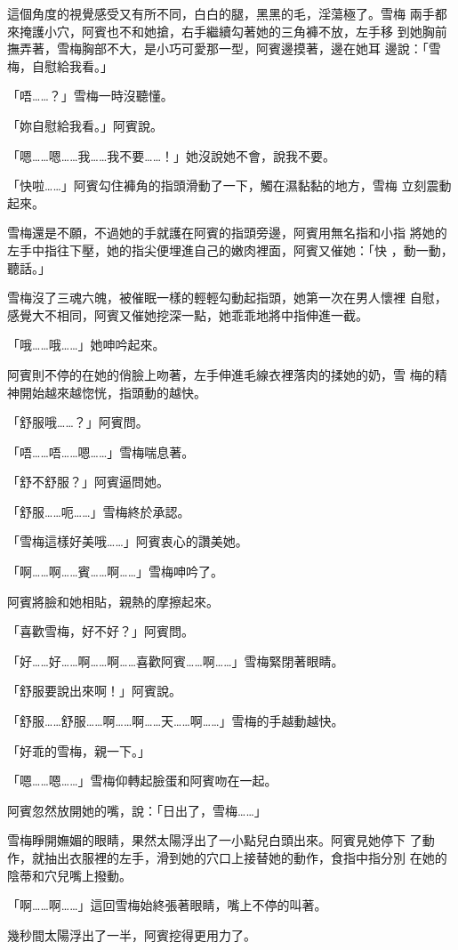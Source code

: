 這個角度的視覺感受又有所不同，白白的腿，黑黑的毛，淫蕩極了。雪梅
兩手都來掩護小穴，阿賓也不和她搶，右手繼續勾著她的三角褲不放，左手移
到她胸前撫弄著，雪梅胸部不大，是小巧可愛那一型，阿賓邊摸著，邊在她耳
邊說：「雪梅，自慰給我看。」

「唔……？」雪梅一時沒聽懂。

「妳自慰給我看。」阿賓說。

「嗯……嗯……我……我不要……！」她沒說她不會，說我不要。

「快啦……」阿賓勾住褲角的指頭滑動了一下，觸在濕黏黏的地方，雪梅
立刻震動起來。

雪梅還是不願，不過她的手就護在阿賓的指頭旁邊，阿賓用無名指和小指
將她的左手中指往下壓，她的指尖便埋進自己的嫩肉裡面，阿賓又催她：「快
，動一動，聽話。」

雪梅沒了三魂六魄，被催眠一樣的輕輕勾動起指頭，她第一次在男人懷裡
自慰，感覺大不相同，阿賓又催她挖深一點，她乖乖地將中指伸進一截。

「哦……哦……」她呻吟起來。

阿賓則不停的在她的俏臉上吻著，左手伸進毛線衣裡落肉的揉她的奶，雪
梅的精神開始越來越惚恍，指頭動的越快。

「舒服哦……？」阿賓問。

「唔……唔……嗯……」雪梅喘息著。

「舒不舒服？」阿賓逼問她。

「舒服……呃……」雪梅終於承認。

「雪梅這樣好美哦……」阿賓衷心的讚美她。

「啊……啊……賓……啊……」雪梅呻吟了。

阿賓將臉和她相貼，親熱的摩擦起來。

「喜歡雪梅，好不好？」阿賓問。

「好……好……啊……啊……喜歡阿賓……啊……」雪梅緊閉著眼睛。

「舒服要說出來啊！」阿賓說。

「舒服……舒服……啊……啊……天……啊……」雪梅的手越動越快。

「好乖的雪梅，親一下。」

「嗯……嗯……」雪梅仰轉起臉蛋和阿賓吻在一起。

阿賓忽然放開她的嘴，說：「日出了，雪梅……」

雪梅睜開嫵媚的眼睛，果然太陽浮出了一小點兒白頭出來。阿賓見她停下
了動作，就抽出衣服裡的左手，滑到她的穴口上接替她的動作，食指中指分別
在她的陰蒂和穴兒嘴上撥動。

「啊……啊……」這回雪梅始終張著眼睛，嘴上不停的叫著。

幾秒間太陽浮出了一半，阿賓挖得更用力了。

